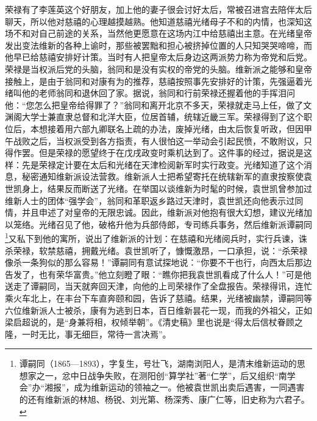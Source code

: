   荣禄有了李莲英这个好朋友，加上他的妻子很会讨好太后，常被召进宫去陪伴太后聊天，所以他对慈禧的心理越摸越熟。他知道慈禧光绪母子不和的内情，也深知这场不和对自己前途的关系，当然他更愿意在这场内江中给慈禧出主意。在光绪皇帝发出变法维新的各种上谕时，那些被罢黜和担心被挤掉位置的人只知哭哭啼啼，而他早已给慈禧安排好计策。当时有人把皇帝太后身边这两派势力称为帝党和后党。荣禄是当权派后党的头脑，翁同和是没有实权的帝党的头脑。维新派之能够和皇帝接触上，是由于翁同和对康有为的推荐，慈禧按照事先安排好的计策，先强逼着光绪叫他的老师翁同和退休回了家。据说，翁同和行前荣禄还握着他的手挥泪问他：“您怎么把皇帝给得罪了？”翁同和离开北京不多天，荣禄就走马上任，做了文渊阁大学士兼直隶总督和北洋大臣，位居首辅，统辖近畿三军。荣禄得到了这个职位后，本想接着用六部九卿联名上疏的办法，废掉光绪，由太后恢复听政，但因甲午战败之后，当权派受到各方指责，有人很怕这一举动会引起民愤，不敢附议，只得作罢。但是荣禄的愿望终于在戊戌政变时乘机达到了。这件事的经过，据说是这样：先是荣禄定计要在太后和光绪在天津检阅新军时实行政变。光绪知道了这个消息，秘密通知维新派设法营救。维新派人士把希望寄托在统辖新军的直隶按察使袁世凯身上，结果反而断送了光绪。在举国以谈维新为时髦的时候，袁世凯曾参加过维新人士的团体“强学会”，翁同和革职返乡路过天津时，袁世凯还向他表示过同情，并且申述了对皇帝的无限忠诚。因此，维新派对他抱有很大幻想，建议光绪加以笼络。光绪召见了他，破格升他为兵部侍郎，专司练兵事务，然后维新派谭嗣同\footnote{谭嗣同（1865—1893），字复生，号壮飞，湖南浏阳人，是清末维新运动的思想家之一，忿中日战争失败，在测阳创“算学社”著“仁学”，后又组织“南学会”办“湘报”，成为维新运动的领袖之一。他被袁世凯出卖后遇害，一同遇害的还有维新派的林旭、杨锐、刘光第、杨深秀、康广仁等，旧史称为六君子。}又私下到他的寓所，说出了维新派的计划：在慈禧和光绪阅兵时，实行兵谏，诛杀荣禄，软禁慈禧，拥戴光绪。袁世凯听了，慷慨激昂，一口承担，说：“杀荣禄像杀一条狗似的那么容易！”谭嗣同有意试探地说：“你要不干也行，向西太后那边告发了，也有荣华富贵。”他立刻瞪了眼：“瞧你把我袁世凯看成了什么人！”可是他送走了谭嗣同，当天就奔回天津，向他的上司荣禄作了全盘报告。荣禄得讯，连忙乘火车北上，在丰台下车直奔颐和园，告诉了慈禧。结果，光绪被幽禁，谭嗣同等六位维新派人士被杀，康有为逃到日本，百日维新昙花一现，而我的外祖父，正如梁启超说的，是“身兼将相，权倾举朝”。《清史稿》里也说是“得太后信杖眷顾之隆，一时无比，事无细巨，常待一言决焉”。\\

